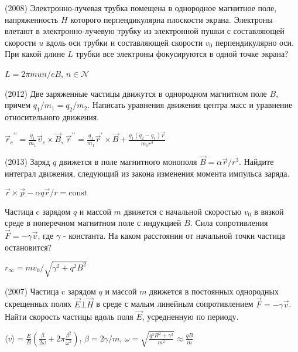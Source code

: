 \begin{ex}
(2008) Электронно-лучевая трубка помещена в однородное магнитное поле, напряженность $H$ которого перпендикулярна плоскости экрана. Электроны влетают в электронно-лучевую трубку из электронной пушки с составляющей скорости $u$ вдоль оси трубки и составляющей скорости $v_0$ перпендикулярно оси. При какой длине $L$ трубки все электроны фокусируются в одной точке экрана?
\begin{ans}
$L=2\pi m u n/ eB$, $n \in \mathcal{N}$
\end{ans}
\end{ex}

\begin{ex}
(2012) Две заряженные частицы движутся в однородном магнитном поле $B$, причем $q_1/m_1 = q_2/m_2$. Написать уравнения движения центра масс и уравнение относительного движения.
\begin{ans}
${\vec{r}_c}^{\prime \prime} = \frac{q_1}{m_1}\vec{v}_c \times \vec B$, 
${\vec{r}}^{\prime \prime} = \frac{q_1}{m_1}\vec{r}^{\prime} \times \vec B + \frac{q_1(q_2-q_1)\vec r}{m_1 r^3}$
\end{ans}
\end{ex}

\begin{ex}
(2013) Заряд $q$ движется в поле магнитного монополя $\vec{B} = \alpha \vec{r}/r^3$. Найдите интеграл движения, следующий из закона изменения момента импульса заряда.
\begin{ans}
$\vec r \times \vec p - \alpha q \vec r/ r = \text{const} $
\end{ans}
\end{ex}

\begin{ex}
Частица c зарядом $q$ и массой $m$ движется с начальной скоростью $v_0$ в вязкой среде в поперечном магнитном поле с индукцией $B$. Сила сопротивления $\vec{F} = -\gamma \vec{v}$, где $\gamma$ - константа. На каком расстоянии от начальной точки частица остановится?
\begin{ans}
$r_{\infty} = mv_0/\sqrt{\gamma^2 + q^2B^2}$
\end{ans}
\end{ex}

\begin{ex}
(2007) Частица c зарядом $q$ и массой $m$ движется в постоянных однородных скрещенных полях $\vec{E} \bot \vec{H}$ в среде с малым линейным сопротивлением $\vec{F} = -\gamma \vec{v}$. Найти скорость частицы вдоль поля $\vec{E}$, усредненную по периоду.
\begin{ans}
$\langle v \rangle = \frac{E}{B}\left(\frac{\beta}{2\omega} + 2\pi \frac{\beta^2}{\omega^2} \right)$, $\beta = 2\gamma/m$, $\omega = \sqrt{\frac{q^2B^2+\gamma^2}{m^2}} \approx \frac{qB}{m}$
\end{ans}
\end{ex}

